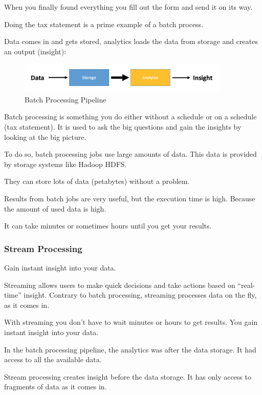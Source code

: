 \documentclass[12pt]{scrartcl} %
\begin{document}
When you finally found everything you fill out the form and send it on its way.

Doing the tax statement is a prime example of a batch process.

Data comes in and gets stored, analytics loads the data from storage and creates an output (insight):

\begin{figure}[htbp] 
  \centering
     \includegraphics[width=0.9\textwidth]{images/Simple-Batch-Processing-Workflow}
  \caption{Batch Processing Pipeline}
  \label{fig:Bild1}
\end{figure}

Batch processing is something you do either without a schedule or on a schedule (tax statement). It is used to ask the big questions and gain the insights by looking at the big picture.

To do so, batch processing jobs use large amounts of data. This data is provided by storage systems like Hadoop HDFS.

They can store lots of data (petabytes) without a problem.

Results from batch jobs are very useful, but the execution time is high. Because the amount of used data is high.

It can take minutes or sometimes hours until you get your results.



\subsubsection{Stream Processing} Gain instant insight into your data.

Streaming allows users to make quick decisions and take actions based on “real-time” insight. Contrary to batch processing, streaming processes data on the fly, as it comes in.

With streaming you don’t have to wait minutes or hours to get results. You gain instant insight into your data.

In the batch processing pipeline, the analytics was after the data storage. It had access to all the available data.

Stream processing creates insight before the data storage. It has only access to fragments of data as it comes in.
\end{document}
